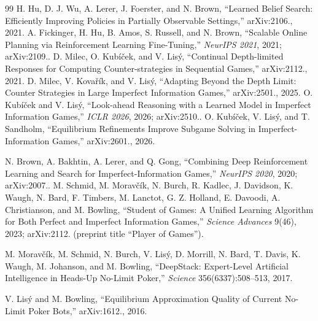 \begin{thebibliography}{99}
H. Hu, D. J. Wu, A. Lerer, J. Foerster, and N. Brown, ``Learned Belief Search:
Efficiently Improving Policies in Partially Observable Settings,''
arXiv:2106., 2021.
A. Fickinger, H. Hu, B. Amos, S. Russell, and N. Brown, ``Scalable Online
Planning via Reinforcement Learning Fine-Tuning,'' \emph{NeurIPS 2021}, 2021;
arXiv:2109..
D. Milec, O. Kub\'i\v{c}ek, and V. Lis\'y, ``Continual Depth-limited Responses
for Computing Counter-strategies in Sequential Games,'' arXiv:2112., 2021.
D. Milec, V. Kova\v{r}\'ik, and V. Lis\'y, ``Adapting Beyond the Depth Limit:
Counter Strategies in Large Imperfect Information Games,'' arXiv:2501.,
2025.
O. Kub\'i\v{c}ek and V. Lis\'y, ``Look-ahead Reasoning with a Learned Model in
Imperfect Information Games,'' \emph{ICLR 2026}, 2026; arXiv:2510..
O. Kub\'i\v{c}ek, V. Lis\'y, and T. Sandholm, ``Equilibrium Refinements Improve
Subgame Solving in Imperfect-Information Games,'' arXiv:2601., 2026.

N. Brown, A. Bakhtin, A. Lerer, and Q. Gong, ``Combining Deep Reinforcement
Learning and Search for Imperfect-Information Games,'' \emph{NeurIPS 2020},
2020; arXiv:2007..
M. Schmid, M. Morav\v{c}\'ik, N. Burch, R. Kadlec, J. Davidson, K. Waugh,
N. Bard, F. Timbers, M. Lanctot, G. Z. Holland, E. Davoodi, A. Christianson, and
M. Bowling, ``Student of Games: A Unified Learning Algorithm for Both Perfect
and Imperfect Information Games,'' \emph{Science Advances} 9(46), 2023;
arXiv:2112. (preprint title ``Player of Games'').

M. Morav\v{c}\'ik, M. Schmid, N. Burch, V. Lis\'y, D. Morrill, N. Bard,
T. Davis, K. Waugh, M. Johanson, and M. Bowling, ``DeepStack: Expert-Level
Artificial Intelligence in Heads-Up No-Limit Poker,'' \emph{Science}
356(6337):508--513, 2017.

V. Lis\'y and M. Bowling, ``Equilibrium Approximation Quality of Current
No-Limit Poker Bots,'' arXiv:1612., 2016.


\end{thebibliography}
